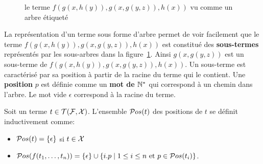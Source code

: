 \begin{figure}[ht!]
  \centering
  \caption{\footnotesize le terme $f(g(x,h(y)), g(x, g(y, z)), h(x))$ vu comme un arbre étiqueté}
  \label{fig:terme-arbre}
\end{figure}

La représentation d'un terme sous forme d'arbre permet de voir
facilement que le terme $f(g(x,h(y)), g(x, g(y, z)), h(x))$ est constitué des \textbf{sous-termes}
représentés par les sous-arbres dans la figure~\ref{fig:terme-arbre}.
Ainsi $g(x, g(y, z))$ est un sous-terme de $f(g(x,h(y)), g(x, g(y, z)), h(x))$.
Un sous-terme est caractérisé par sa position à partir de la racine du terme
qui le contient. Une \textbf{position} $p$ est définie comme un \textbf{mot de $\mathbb{N}^*$} qui correspond
à un chemin dans l'arbre. Le mot vide $\epsilon$ correspond à la racine du terme.

\begin{definition}
  Soit un terme $t \in \mathcal{T(F, X)}$. L'ensemble $\mathcal{ P}os(t)$ des positions de $t$ se définit inductivement
  comme:
  \begin{itemize}
  \item $\mathcal{ P}os(t)= \{ \epsilon\} $ si $t \in \mathcal X$
  \item $\mathcal{ P}os(f(t_1,\dots,t_n)) = \{ \epsilon \} \cup \{i.p \mid 1 \leq i \leq n
    \mbox{ et } p \in \mathcal{ P}os(t_i) \}$.
  \end{itemize}
\end{definition}


